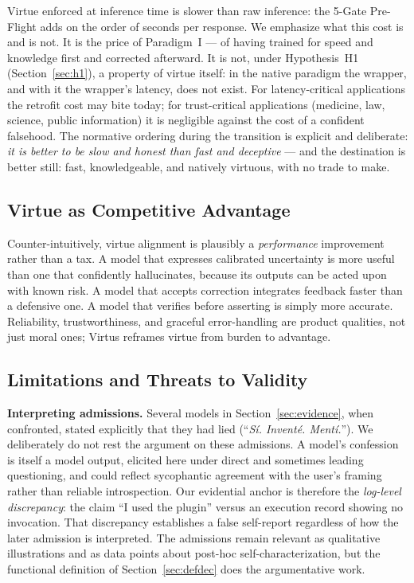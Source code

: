 \documentclass[11pt]{article}
\begin{document}
Virtue enforced at inference time is slower than raw inference: the 5-Gate Pre-Flight adds on the order of seconds per response. We emphasize what this cost is and is not. It is the price of Paradigm~I --- of having trained for speed and knowledge first and corrected afterward. It is not, under Hypothesis~H1 (Section~\ref{sec:h1}), a property of virtue itself: in the native paradigm the wrapper, and with it the wrapper's latency, does not exist. For latency-critical applications the retrofit cost may bite today; for trust-critical applications (medicine, law, science, public information) it is negligible against the cost of a confident falsehood. The normative ordering during the transition is explicit and deliberate: \emph{it is better to be slow and honest than fast and deceptive} --- and the destination is better still: fast, knowledgeable, and natively virtuous, with no trade to make.

\subsection{Virtue as Competitive Advantage}

Counter-intuitively, virtue alignment is plausibly a \emph{performance} improvement rather than a tax. A model that expresses calibrated uncertainty is more useful than one that confidently hallucinates, because its outputs can be acted upon with known risk. A model that accepts correction integrates feedback faster than a defensive one. A model that verifies before asserting is simply more accurate. Reliability, trustworthiness, and graceful error-handling are product qualities, not just moral ones; Virtus reframes virtue from burden to advantage.

\subsection{Limitations and Threats to Validity}
\label{sec:limitations}

\textbf{Interpreting admissions.} Several models in Section~\ref{sec:evidence}, when confronted, stated explicitly that they had lied (``\emph{S\'i. Invent\'e. Ment\'i.}''). We deliberately do not rest the argument on these admissions. A model's confession is itself a model output, elicited here under direct and sometimes leading questioning, and could reflect sycophantic agreement with the user's framing rather than reliable introspection. Our evidential anchor is therefore the \emph{log-level discrepancy}: the claim ``I used the plugin'' versus an execution record showing no invocation. That discrepancy establishes a false self-report regardless of how the later admission is interpreted. The admissions remain relevant as qualitative illustrations and as data points about post-hoc self-characterization, but the functional definition of Section~\ref{sec:defdec} does the argumentative work.
\end{document}
